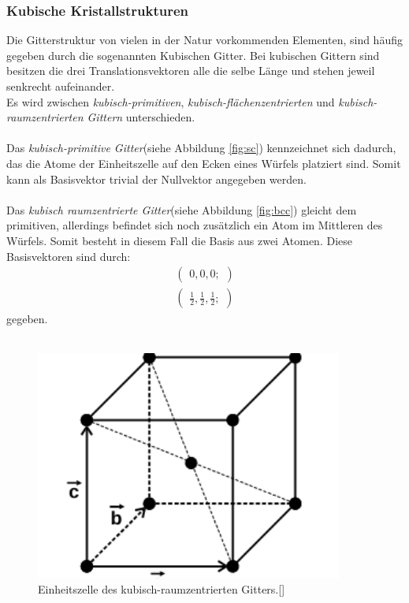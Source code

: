 \subsubsection{Kubische Kristallstrukturen}
\label{subsubsec:kubische_gitter}

Die Gitterstruktur von vielen in der Natur vorkommenden Elementen,
sind häufig gegeben durch die sogenannten Kubischen Gitter.
Bei kubischen Gittern sind besitzen die drei Translationsvektoren
alle die selbe Länge und stehen jeweil senkrecht aufeinander.\\
Es wird zwischen \textit{kubisch-primitiven},
\textit{kubisch-flächenzentrierten} und
\textit{kubisch-raumzentrierten Gittern} unterschieden. \\ \\
Das \textit{kubisch-primitive Gitter}(siehe Abbildung \ref{fig:sc})
kennzeichnet sich dadurch,
das die Atome der Einheitszelle auf den Ecken
eines Würfels platziert sind. Somit kann als Basisvektor trivial
der Nullvektor angegeben werden.\\ \\
Das \textit{kubisch raumzentrierte Gitter}(siehe Abbildung \ref{fig:bcc})
gleicht dem primitiven, allerdings befindet sich noch
zusätzlich ein Atom im Mittleren des Würfels.
Somit besteht in diesem Fall die Basis aus zwei Atomen.
Diese Basisvektoren sind durch:
\begin{align}
  \label{eqn:2*}
  \begin{pmatrix}
    0, 0, 0;
  \end{pmatrix}\\
  \begin{pmatrix}
    \frac{1}{2}, \frac{1}{2}, \frac{1}{2};
  \end{pmatrix}
\end{align}
gegeben.\\ \\

\begin{figure}[hhh]
  \centering
  \includegraphics[width=0.9\textwidth]{abbildungen/bcc.png}
  \caption{Einheitszelle des kubisch-raumzentrierten Gitters.[\cite{sample}]}
\end{figure}

